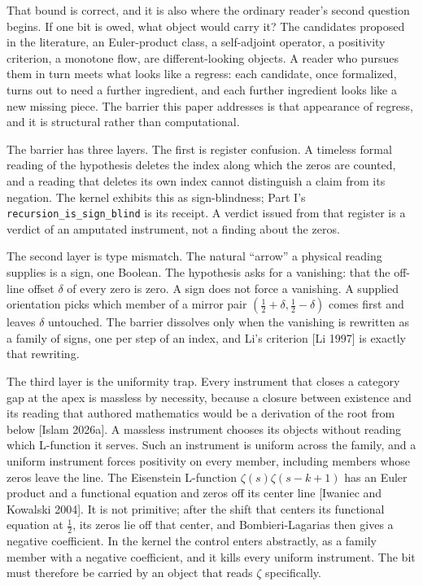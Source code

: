 \documentclass[10pt]{article}
\begin{document}
That bound is correct, and it is also where the ordinary reader's second
question begins. If one bit is owed, what object would carry it? The
candidates proposed in the literature, an Euler-product class, a
self-adjoint operator, a positivity criterion, a monotone flow, are
different-looking objects. A reader who pursues them in turn meets what
looks like a regress: each candidate, once formalized, turns out to need
a further ingredient, and each further ingredient looks like a new
missing piece. The barrier this paper addresses is that appearance of
regress, and it is structural rather than computational.

The barrier has three layers. The first is register confusion. A
timeless formal reading of the hypothesis deletes the index along which
the zeros are counted, and a reading that deletes its own index cannot
distinguish a claim from its negation. The kernel exhibits this as
sign-blindness; Part I's \texttt{recursion\_is\_sign\_blind} is its
receipt. A verdict issued from that register is a verdict of an
amputated instrument, not a finding about the zeros.

The second layer is type mismatch. The natural ``arrow'' a physical
reading supplies is a sign, one Boolean. The hypothesis asks for a
vanishing: that the off-line offset \(\delta\) of every zero is zero. A
sign does not force a vanishing. A supplied orientation picks which
member of a mirror pair \((\tfrac12 + \delta, \tfrac12 - \delta)\) comes
first and leaves \(\delta\) untouched. The barrier dissolves only when
the vanishing is rewritten as a family of signs, one per step of an
index, and Li's criterion {[}Li 1997{]} is exactly that rewriting.

The third layer is the uniformity trap. Every instrument that closes a
category gap at the apex is massless by necessity, because a closure
between existence and its reading that authored mathematics would be a
derivation of the root from below {[}Islam 2026a{]}. A massless
instrument chooses its objects without reading which L-function it
serves. Such an instrument is uniform across the family, and a uniform
instrument forces positivity on every member, including members whose
zeros leave the line. The Eisenstein L-function \(\zeta(s)\zeta(s-k+1)\)
has an Euler product and a functional equation and zeros off its center
line {[}Iwaniec and Kowalski 2004{]}. It is not primitive; after the
shift that centers its functional equation at \(\tfrac12\), its zeros
lie off that center, and Bombieri-Lagarias then gives a negative
coefficient. In the kernel the control enters abstractly, as a family
member with a negative coefficient, and it kills every uniform
instrument. The bit must therefore be carried by an object that reads
\(\zeta\) specifically.
\end{document}
